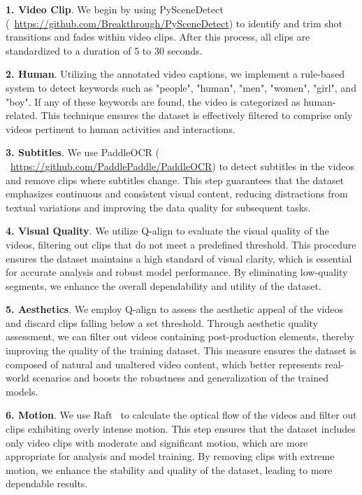 \documentclass{article} %
\begin{document}
\textbf{1. Video Clip}. We begin by using PySceneDetect (~\href{https://github.com/Breakthrough/PySceneDetect}{https://github.com/Breakthrough/PySceneDetect}) to identify and trim shot transitions and fades within video clips. After this process, all clips are standardized to a duration of 5 to 30 seconds.

\textbf{2. Human}. Utilizing the annotated video captions, we implement a rule-based system to detect keywords such as "people", "human", "men", "women", "girl", and "boy". If any of these keywords are found, the video is categorized as human-related. This technique ensures the dataset is effectively filtered to comprise only videos pertinent to human activities and interactions.

\textbf{3. Subtitles}. We use PaddleOCR ( ~\href{https://github.com/PaddlePaddle/PaddleOCR}{https://github.com/PaddlePaddle/PaddleOCR}) to detect subtitles in the videos and remove clips where subtitles change. This step guarantees that the dataset emphasizes continuous and consistent visual content, reducing distractions from textual variations and improving the data quality for subsequent tasks.

\textbf{4. Visual Quality}. We utilize Q-align \citep{wu2023q} to evaluate the visual quality of the videos, filtering out clips that do not meet a predefined threshold. This procedure ensures the dataset maintains a high standard of visual clarity, which is essential for accurate analysis and robust model performance. By eliminating low-quality segments, we enhance the overall dependability and utility of the dataset.

\textbf{5. Aesthetics}. We employ Q-align \citep{wu2023q} to assess the aesthetic appeal of the videos and discard clips falling below a set threshold. Through aesthetic quality assessment, we can filter out videos containing post-production elements, thereby improving the quality of the training dataset. This measure ensures the dataset is composed of natural and unaltered video content, which better represents real-world scenarios and boosts the robustness and generalization of the trained models.

\textbf{6. Motion}. We use Raft~\citep{teed2020raft} to calculate the optical flow of the videos and filter out clips exhibiting overly intense motion. This step ensures that the dataset includes only video clips with moderate and significant motion, which are more appropriate for analysis and model training. By removing clips with extreme motion, we enhance the stability and quality of the dataset, leading to more dependable results.
\end{document}
